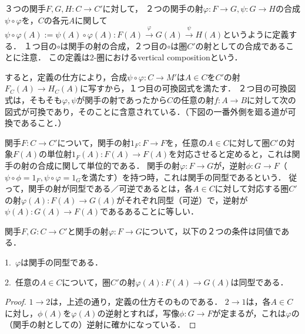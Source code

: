 \documentclass[uplatex, dvipdfmx]{jsreport}
\begin{document}
\begin{definition}[関手の射の合成]
    ３つの関手$F,G,H:C\rightarrow C'$に対して，
    ２つの関手の射$\varphi :F\rightarrow G, \psi :G\rightarrow H$の合成$\psi\circ\varphi$を，$C$の各元$A$に関して
    $\psi\circ\varphi (A):=\psi (A)\circ\varphi (A):F(A)\xrightarrow{\varphi}G(A)\xrightarrow{\psi} H(A)$というように定義する．
    １つ目の$\circ$は関手の射の合成，２つ目の$\circ$は圏$C'$の射としての合成であることに注意．
    この定義は2-圏におけるvertical compositionという．
\end{definition}
\begin{remark}
    すると，定義の仕方により，合成$\psi\circ\varphi :C\to M'$は$A\in C$を$C'$の射$F_C(A)\to H_C(A)$に写すから，１つ目の可換図式を満たす．
    ２つ目の可換図式は，そもそも$\varphi, \psi$が関手の射であったから$C$の任意の射$f:A\to B$に対して次の図式が可換であり，そのことに含意されている．（下図の一番外側を廻る道が可換であること．）
    \begin{center}\end{center}
\end{remark}

\begin{definition}
    関手$F:C\to C'$について，関手の射$1_F:F\to F$を，任意の$A\in C$に対して圏$C'$の対象$F(A)$の単位射$1_F(A):F(A)\to F(A)$を対応させると定めると，これは関手の射の合成に関して単位的である．
    関手の射$\varphi :F\rightarrow G$が，逆射$\phi :G\rightarrow F$（$\psi\circ\phi =1_F, \psi\circ\varphi =1_G$を満たす）を持つ時，これは関手の同型であるという．
    従って，関手の射が同型である／可逆であるとは，各$A\in C$に対して対応する圏$C'$の射$\varphi (A):F(A)\rightarrow G(A)$がそれぞれ同型（可逆）で，逆射が$\psi (A):G(A)\to F(A)$であるあることに等しい．
\end{definition}

\begin{proposition}[関手の同型の特徴付け]\label{prop-charactorization-natural-equavalence}
    関手$F,G:C\to C'$と関手の射$\varphi :F\to G$について，以下の２つの条件は同値である．\rm{}

    1.\, $\varphi$は関手の同型である．

    2.\, 任意の$A\in C$について，圏$C'$の射$\varphi (A):F(A)\to G(A)$は同型である．
\end{proposition}
\begin{proof}
    $1\to 2$は，上述の通り，定義の仕方そのものである．
    $2\to 1$は，各$A\in C$に対し，$\phi (A)$を$\varphi (A)$の逆射とすれば，写像$\phi :G\to F$が定まるが，これは$\varphi$の（関手の射としての）逆射に確かになっている．
\end{proof}
\end{document}
